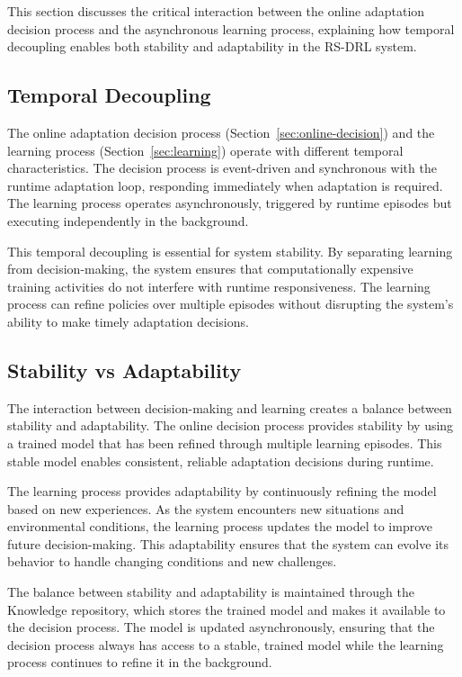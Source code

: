 \documentclass[11pt,a4paper]{article}
\begin{document}
This section discusses the critical interaction between the online adaptation decision process and the asynchronous learning process, explaining how temporal decoupling enables both stability and adaptability in the RS-DRL system.

\subsection{Temporal Decoupling}

The online adaptation decision process (Section~\ref{sec:online-decision}) and the learning process (Section~\ref{sec:learning}) operate with different temporal characteristics. The decision process is event-driven and synchronous with the runtime adaptation loop, responding immediately when adaptation is required. The learning process operates asynchronously, triggered by runtime episodes but executing independently in the background.

This temporal decoupling is essential for system stability. By separating learning from decision-making, the system ensures that computationally expensive training activities do not interfere with runtime responsiveness. The learning process can refine policies over multiple episodes without disrupting the system's ability to make timely adaptation decisions.

\subsection{Stability vs Adaptability}

The interaction between decision-making and learning creates a balance between stability and adaptability. The online decision process provides stability by using a trained model that has been refined through multiple learning episodes. This stable model enables consistent, reliable adaptation decisions during runtime.

The learning process provides adaptability by continuously refining the model based on new experiences. As the system encounters new situations and environmental conditions, the learning process updates the model to improve future decision-making. This adaptability ensures that the system can evolve its behavior to handle changing conditions and new challenges.

The balance between stability and adaptability is maintained through the Knowledge repository, which stores the trained model and makes it available to the decision process. The model is updated asynchronously, ensuring that the decision process always has access to a stable, trained model while the learning process continues to refine it in the background.
\end{document}
